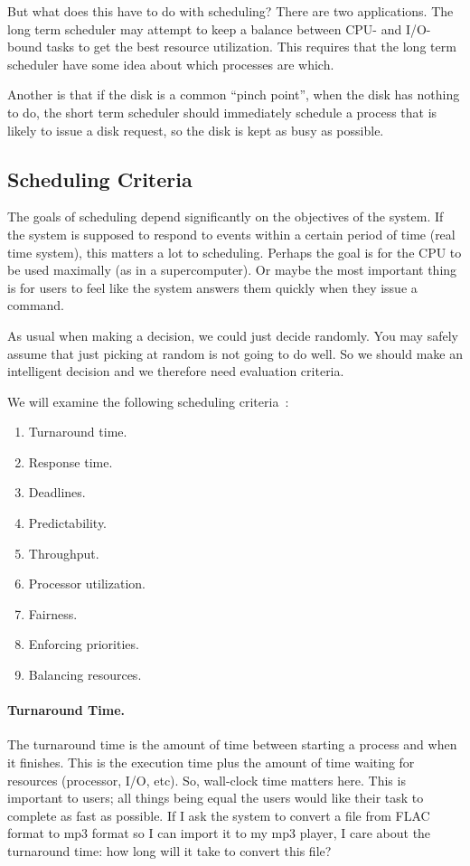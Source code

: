 But what does this have to do with scheduling? There are two applications. The long term scheduler may attempt to keep a balance between CPU- and I/O-bound tasks to get the best resource utilization. This requires that the long term scheduler have some idea about which processes are which.

Another is that if the disk is a common ``pinch point'', when the disk has nothing to do, the short term scheduler should immediately schedule a process that is likely to issue a disk request, so the disk is kept as busy as possible.

\subsection*{Scheduling Criteria}

The goals of scheduling depend significantly on the objectives of the system. If the system is supposed to respond to events within a certain period of time (real time system), this matters a lot to scheduling. Perhaps the goal is for the CPU to be used maximally (as in a supercomputer). Or maybe the most important thing is for users to feel like the system answers them quickly when they issue a command.

As usual when making a decision, we could just decide randomly. You may safely assume that just picking at random is not going to do well. So we should make an intelligent decision and  we therefore need evaluation criteria.

We will examine the following scheduling criteria~\cite{osi}:

\begin{enumerate}
	\item Turnaround time.
	\item Response time.
	\item Deadlines.
	\item Predictability.
	\item Throughput.
	\item Processor utilization.
	\item Fairness.
	\item Enforcing priorities.
	\item Balancing resources.
\end{enumerate}

\paragraph{Turnaround Time.} The turnaround time is the amount of time between starting a process and when it finishes. This is the execution time plus the amount of time waiting for resources (processor, I/O, etc). So, wall-clock time matters here. This is important to users; all things being equal the users would like their task to complete as fast as possible. If I ask the system to convert a file from FLAC format to mp3 format so I can import it to my mp3 player, I care about the turnaround time: how long will it take to convert this file?

